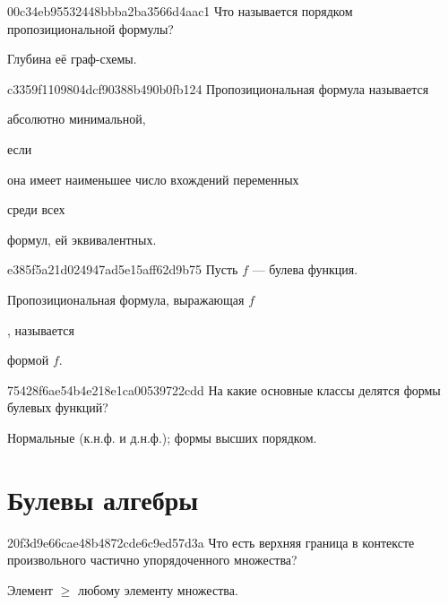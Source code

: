 \begin{note}{00c34eb95532448bbba2ba3566d4aac1}
    Что называется порядком пропозициональной формулы?

    \begin{cloze}{1}
        Глубина её граф-схемы.
    \end{cloze}
\end{note}

\begin{note}{c3359f1109804dcf90388b490b0fb124}
    Пропозициональная формула называется \begin{icloze}{3}абсолютно минимальной,\end{icloze} если \begin{icloze}{2}она имеет наименьшее число вхождений переменных\end{icloze} среди всех \begin{icloze}{1}формул, ей эквивалентных.\end{icloze}
\end{note}

\begin{note}{e385f5a21d024947ad5e15aff62d9b75}
    Пусть \({ f }\) --- булева функция.
    \begin{icloze}{2}Пропозициональная формула, выражающая \({ f }\)\end{icloze}, называется \begin{icloze}{1}формой \({ f }\).\end{icloze}
\end{note}

\begin{note}{75428f6ae54b4e218e1ca00539722cdd}
    На какие основные классы делятся формы булевых функций?

    \begin{cloze}{1}
        Нормальные (к.н.ф. и д.н.ф.); формы высших порядком.
    \end{cloze}
\end{note}

\section{Булевы алгебры}
\begin{note}{20f3d9e66cae48b4872cde6c9ed57d3a}
    Что есть верхняя граница в контексте произвольного частично упорядоченного множества?

    \begin{cloze}{1}
        Элемент \({ \geqslant }\) любому элементу множества.
    \end{cloze}
\end{note}


